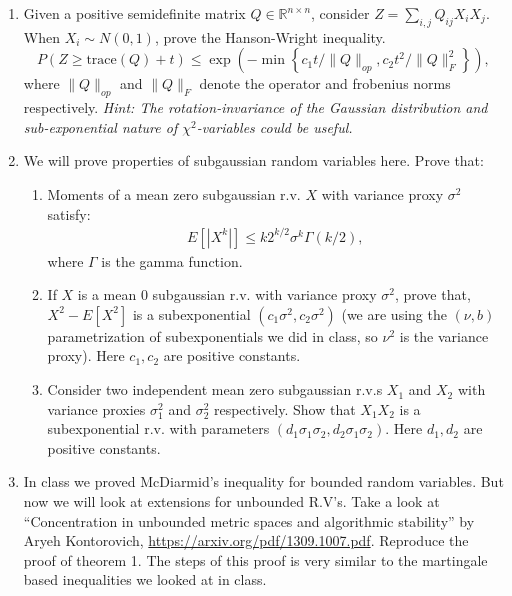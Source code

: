 \documentclass[11pt]{article}
\begin{document}
\begin{enumerate}
\item Given a positive semidefinite matrix $Q\in \mathbb{R}^{n\times n}$, consider $Z=\sum_{i,j}Q_{ij}X_iX_j$. When $X_i\sim N(0,1)$, prove the Hanson-Wright inequality.
$$P\left(Z\ge \text{trace}(Q)+ t\right)\leq \exp\left(-\min\left\{c_1 t/\|Q\|_{op},c_2 t^2/\|Q\|_F^2\right\}\right),$$
where $\|Q\|_{op}$ and $\|Q\|_{F}$ denote the operator and frobenius norms respectively. \textit{Hint: The rotation-invariance of the
 Gaussian distribution and sub-exponential nature of $\chi^2$-variables could be useful.}
\item We will prove properties of subgaussian random variables here. Prove that:
\begin{enumerate}
\item Moments of a  mean zero subgaussian r.v. $X$ with variance proxy $\sigma^2$ satisfy:
\begin{align}
E[|X^{k}|]\leq k2^{k/2}\sigma^k \Gamma(k/2),
\end{align}
where $\Gamma$ is the gamma function. 
\item If $X$ is a mean 0 subgaussian r.v. with variance proxy $\sigma^2$, prove that,
$X^2-E[X^2]$ is a subexponential $(c_1\sigma^2,c_2\sigma^2)$ (we are using the $(\nu,b)$ parametrization of subexponentials we did in class, so $\nu^2$ is the variance proxy). Here $c_1,c_2$ are positive constants.
\item Consider two independent mean zero subgaussian r.v.s $X_1$ and $X_2$ with variance proxies $\sigma_1^2$ and $\sigma_2^2$ respectively. Show that $X_1X_2$ is a subexponential r.v. with parameters $(d_1\sigma_1\sigma_2, d_2\sigma_1\sigma_2)$. Here $d_1,d_2$ are positive constants.
\end{enumerate}
\item In class we proved McDiarmid's inequality for bounded random variables. But now we will look at extensions for unbounded R.V's. Take a look at ``Concentration in unbounded metric spaces and
algorithmic stability'' by Aryeh Kontorovich,   \url{https://arxiv.org/pdf/1309.1007.pdf}. Reproduce the proof of theorem 1. The steps of this proof is very similar to the martingale based inequalities we looked at in class.
\end{enumerate}
\end{document}
